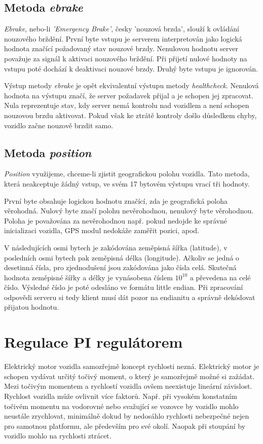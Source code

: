 \documentclass[czech, bachelor]{diploma}
\begin{document}
\subsection{Metoda \emph{ebrake}}
\emph{Ebrake}, nebo-li \emph{'Emergency Brake'}, česky 'nouzová brzda', slouží k ovládání nouzového brždění. První byte vstupu
je serverem interpretován jako logická hodnota značící požadovaný stav nouzové brzdy. Nenulovou hodnotu server považuje za signál
k aktivaci nouzového brždění. Při přijetí nulové hodnoty na vstupu poté dochází k deaktivaci nouzové brzdy. Druhý byte vstupu
je ignorován.

Výstup metody \emph{ebrake} je opět ekvivalentní výstupu metody \emph{healthcheck}. Nenulová hodnota na výstupu značí, že server
požadavek přijal a je schopen jej zpracovat. Nula reprezentuje stav, kdy server nemá kontrolu nad vozidlem a není schopen
nouzovou brzdu aktivovat. Pokud však ke ztrátě kontroly došlo důsledkem chyby, vozidlo začne nouzově brzdit samo.

\subsection{Metoda \emph{position}}

\emph{Position} využijeme, chceme-li zjistit geografickou polohu vozidla. Tato metoda, která neakceptuje žádný vstup, ve svém
17 bytovém výstupu vrací tři hodnoty.

První byte obsahuje logickou hodnotu značící, zda je geografická poloha věrohodná. Nulový byte značí polohu nevěrohodnou,
nenulový byte věrohodnou. Poloha je považována za nevěrohodnou např. pokud nedojde ke správné inicializaci vozidla, GPS modul
nedokáže zaměřit pozici, apod.

V následujících osmi bytech je zakódována zeměpisná šířka (latitude), v posledních osmi bytech pak zeměpisná délka (longitude).
Ačkoliv se jedná o desetinná čísla, pro zjednodušení jsou zakódována jako čísla celá. Skutečná hodnota zeměpisné šířky a délky
je vynásobena číslem $10^{10}$ a převedena na celé číslo. Výsledné číslo je poté odesláno ve formátu little endian. Při zpracování
odpovědi serveru si tedy klient musí dát pozor na endianitu a správně dekódovat přijatou hodnotu.

\section{Regulace PI regulátorem} \label{pi-controller}
Elektrický motor vozidla samozřejmě koncept rychlosti nezná. Elektrický motor je schopen vydávat určitý točivý moment, o který
je samozřejmě možné si zažádat. Mezi točivým momentem a rychlostí vozidla ovšem neexistuje lineární závislost. Rychlost vozidla
může ovlivnit více faktorů. Např. při vysokém konstatním točivém momentu na vodorovné nebo svažující se vozovce by vozidlo mohlo
neustále zrychlovat, minimálně dokud by nedosáhlo rychlosti nebezpečné nejen pro samotnou platformu, ale především pro své okolí.
Naopak při stoupání by vozidlo mohlo na rychlosti ztrácet.
\end{document}
